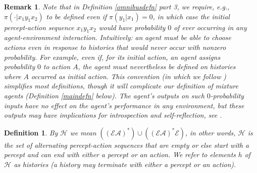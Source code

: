 \documentclass[twoside]{article}
\newtheorem{definition}[theorem]{Definition}
\newtheorem{remark}[theorem]{Remark}
\begin{document}
\begin{remark}
\label{impossibleremark}
    Note that in Definition \ref{omnibusdefn} part 3, we require,
    e.g., $\pi(\cdot|x_1y_1x_2)$ to be defined even if
    $\pi(y_1|x_1)=0$, in which case the initial percept-action sequence $x_1y_1x_2$
    would have probability $0$ of ever occurring in any agent-environment
    interaction. Intuitively: an agent must be able to choose actions even
    in response to histories that would never occur with nonzero probability.
    For example, even if, for its initial action, an agent assigns
    probability $0$ to action $A$, the agent must nevertheless
    be defined on histories where $A$ occurred as initial action.
    This convention (in which we follow \cite{legg2007universal}) simplifies most
    definitions, though it will complicate our definition of mixture agents
    (Definition \ref{maindefn} below). The agent's outputs on such
    $0$-probability inputs have no effect on the agent's performance
    in any environment, but these outputs may have implications for introspection
    and self-reflection, see \cite{extendedenvironmentspaper}.
\end{remark}

\begin{definition}
    By $\mathcal H$ we mean
    $((\mathcal E\mathcal A)^*)\cup((\mathcal E\mathcal A)^*\mathcal E)$,
    in other words, $\mathcal H$ is the set of alternating percept-action
    sequences that are empty or else start with a percept and can end with
    either a percept or an action.
    We refer to elements $h$ of $\mathcal H$ as \emph{histories} (a history
    may terminate with either a percept or an action).
\end{definition}
\end{document}
